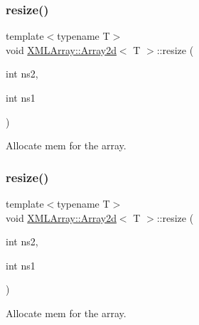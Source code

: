 \subsubsection{\texorpdfstring{resize()}{resize()}\hspace{0.1cm}{\footnotesize\ttfamily [1/2]}}
{\footnotesize\ttfamily template$<$typename T$>$ \\
void \mbox{\hyperlink{classXMLArray_1_1Array2d}{X\+M\+L\+Array\+::\+Array2d}}$<$ T $>$\+::resize (\begin{DoxyParamCaption}\item[{int}]{ns2,  }\item[{int}]{ns1 }\end{DoxyParamCaption})\hspace{0.3cm}{\ttfamily [inline]}}



Allocate mem for the array. 

\mbox{\label{classXMLArray_1_1Array2d_a64001cb2aac062d2179a0285b0279244}} 
\subsubsection{\texorpdfstring{resize()}{resize()}\hspace{0.1cm}{\footnotesize\ttfamily [2/2]}}
{\footnotesize\ttfamily template$<$typename T$>$ \\
void \mbox{\hyperlink{classXMLArray_1_1Array2d}{X\+M\+L\+Array\+::\+Array2d}}$<$ T $>$\+::resize (\begin{DoxyParamCaption}\item[{int}]{ns2,  }\item[{int}]{ns1 }\end{DoxyParamCaption})\hspace{0.3cm}{\ttfamily [inline]}}



Allocate mem for the array. 

